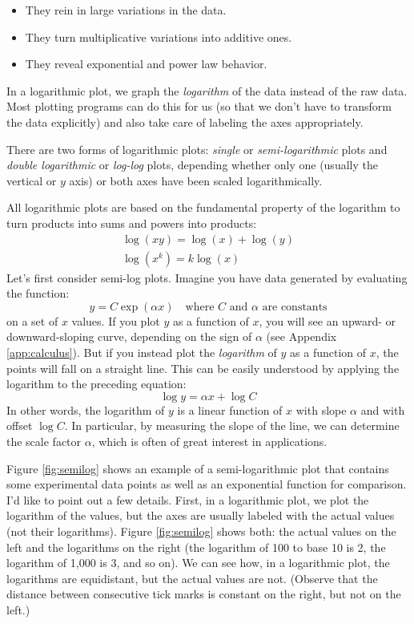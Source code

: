 \begin{itemize}
\item They rein in large variations in the data.
\item They turn multiplicative variations into additive ones.
\item They reveal exponential and power law behavior.
\end{itemize}

In a logarithmic plot, we graph the \emph{logarithm} of the data
instead of the raw data. Most plotting programs can do this for us (so
that we don't have to transform the data explicitly) and also take
care of labeling the axes appropriately.

There are two forms of logarithmic plots: \emph{single} or
\emph{semi-logarithmic} plots  and \emph{double logarithmic}  or
\emph{log-log} plots,  depending whether only one (usually the vertical
or $y$ axis) or both axes have been scaled logarithmically.

All logarithmic plots are based on the fundamental property of the
logarithm to turn products into sums and powers into products:
%
\begin{gather*}
  \log(x y) = \log(x) + \log(y) \\
  \log(x^k) = k \log(x)
\end{gather*}
%
Let's first consider semi-log plots. Imagine you have data generated
by evaluating the function:
%
\[
y = C \exp(\alpha x) \quad \text{where $C$ and $\alpha$ are constants}
\]
%
on a set of $x$ values. If you plot $y$ as a function of $x$, you will
see an upward- or downward-sloping curve, depending on the sign of
$\alpha$ (see Appendix \ref{app:calculus}). But if you instead plot
the \emph{logarithm} of $y$ as a function of $x$, the points will fall
on a straight line. This can be easily understood by applying the
logarithm to the preceding equation:
%
\[
\log y = \alpha x + \log C
\]
%
In other words, the logarithm of $y$ is a linear function of $x$ with
slope $\alpha$ and with offset $\log C$. In particular, by measuring
the slope of the line, we can determine the scale factor $\alpha$,
which is often of great interest in applications.

Figure \ref{fig:semilog} shows an example of a semi-logarithmic plot
that contains some experimental data points as well as an exponential
function for comparison. I'd like to point out a few details. First,
in a logarithmic plot, we plot the logarithm of the values, but the
axes are usually labeled with the actual values (not their
logarithms). Figure \ref{fig:semilog} shows both: the actual values on
the left and the logarithms on the right (the logarithm of 100 to base
10 is 2, the logarithm of 1,000 is 3, and so on). We can see how, in a
logarithmic plot, the logarithms are equidistant, but the actual values
are not. (Observe that the distance between consecutive tick marks is
constant on the right, but not on the left.)

